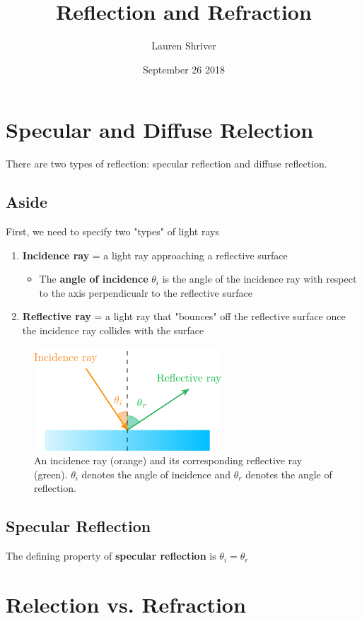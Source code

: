 \documentclass[a4paper]{article}
\title{Reflection and Refraction}
\author{Lauren Shriver}
\date{September 26 2018}
\begin{document}
\maketitle

\section*{Specular and Diffuse Relection}
There are two types of reflection: specular reflection and diffuse reflection. 
\subsection*{Aside}
First, we need to specify two "types" of light rays
\begin{enumerate}
    \item \textbf{Incidence ray} = a light ray approaching a reflective surface
        \begin{itemize}
            \item The \textbf{angle of incidence} $\theta_i$ is the angle of the incidence ray with respect to the axis perpendicualr to the reflective surface 
        \end{itemize}
    \item \textbf{Reflective ray} = a light ray that "bounces" off the reflective surface once the incidence ray collides with the surface 
\end{enumerate}
\begin{figure}[htp!]
        \centering
        \includegraphics[width=7cm]{incidence_refractive.png}
        \caption{An incidence ray (orange) and its corresponding reflective ray (green). $\theta_i$ denotes the angle of incidence and $\theta_r$ denotes the angle of reflection.}
        \label{fig:my_label}
\end{figure}
\subsection*{Specular Reflection}
The defining property of \textbf{specular reflection} is $\theta_i = \theta_r$ 
\section*{Relection vs. Refraction}
\end{document}
